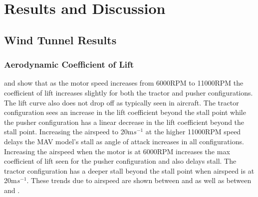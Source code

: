 \graphicspath{{./Figs/}}

\chapter{Results and Discussion} 

\section{Wind Tunnel Results}

\subsection{Aerodynamic Coefficient of Lift}
 and  show that as the motor speed increases from 6000RPM to 11000RPM the coefficient of lift increases slightly for both the tractor and pusher configurations. The lift curve also does not drop off as typically seen in aircraft. The tractor configuration sees an increase in the lift coefficient beyond the stall point while the pusher configuration has a linear decrease in the lift coefficient beyond the stall point. Increasing the airspeed to 20m$s^{-1}$ at the higher 11000RPM speed delays the MAV model's stall as angle of attack increases in all configurations. Increasing the airspeed when the motor is at 6000RPM increases the max coefficient of lift seen for the pusher configuration  and also delays stall. The tractor configuration has a deeper stall beyond the stall point when airspeed is at 20m$s^{-1}$. These trends due to airspeed are shown between  and  as well as between  and . 

